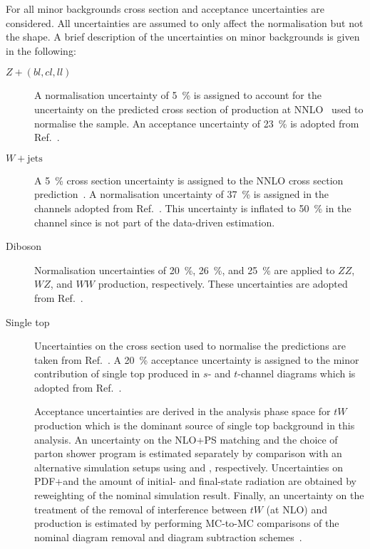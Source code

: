 For all minor backgrounds cross section and acceptance uncertainties
are considered. All uncertainties are assumed to only affect the
normalisation but not the shape.    A brief
description of the uncertainties on minor backgrounds is given in the
following:
\begin{description}

\item[$Z + (bl, cl, ll)$] A normalisation uncertainty of
  \SI{5}{\percent} is assigned to account for the uncertainty on the
  predicted cross section of \Zjets production at
  NNLO~\cite{Anastasiou:2003ds} used to normalise the sample. An
  acceptance uncertainty of \SI{23}{\percent} is adopted from
  Ref.~\cite{HIGG-2018-51}.

\item[$W + \text{jets}$] A \SI{5}{\percent} cross section uncertainty
  is assigned to the NNLO cross section
  prediction~\cite{Anastasiou:2003ds}. A normalisation uncertainty of
  \SI{37}{\percent} is assigned in the \lephad channels adopted from
  Ref.~\cite{HIGG-2018-51}. This uncertainty is inflated to
  \SI{50}{\percent} in the \hadhad channel since \Wjets is not part of
  the data-driven \faketauhadvis estimation.

\item[Diboson] Normalisation uncertainties of \SI{20}{\percent},
  \SI{26}{\percent}, and \SI{25}{\percent} are applied to $ZZ$, $WZ$,
  and $WW$ production, respectively. These uncertainties are adopted
  from Ref.~\cite{HIGG-2018-51}.

\item[Single top] Uncertainties on the cross section used to normalise
  the predictions are taken from Ref.~\cite{stopxsec}. A
  \SI{20}{\percent} acceptance uncertainty is assigned to the minor
  contribution of single top produced in $s$- and $t$-channel diagrams
  which is adopted from Ref.~\cite{HIGG-2018-51}.

  Acceptance uncertainties are derived in the analysis phase space for
  $tW$ production which is the dominant source of single top
  background in this analysis. An uncertainty on the NLO+PS matching
  and the choice of parton shower program is estimated separately by
  comparison with an alternative simulation setups using \MGNLO[2.6.2]
  and \HERWIG[7], respectively. Uncertainties on PDF+\alphas and the
  amount of initial- and final-state radiation are obtained by
  reweighting of the nominal simulation result. Finally, an
  uncertainty on the treatment of the removal of interference between
  $tW$ (at NLO) and \ttbar production is estimated by performing
  MC-to-MC comparisons of the nominal diagram removal and diagram
  subtraction schemes~\cite{Frixione:2008yi}.


\end{description}
